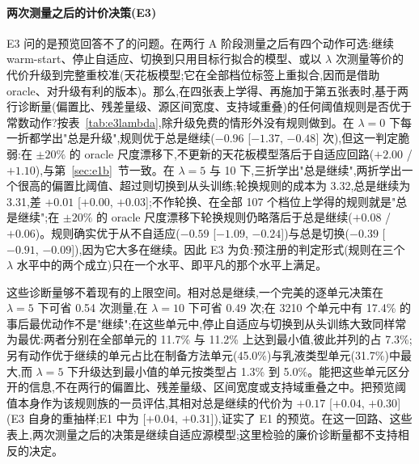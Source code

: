 \documentclass[11pt,a4paper]{ctexart}
\begin{document}
\paragraph{两次测量之后的计价决策(E3)} E3 问的是预览回答不了的问题。在两行 A 阶段测量之后有四个动作可选:继续 warm-start、停止自适应、切换到只用目标行拟合的模型、或以 $\lambda$ 次测量等价的代价升级到完整重校准(天花板模型;它在全部档位标签上重拟合,因而是借助 oracle、对升级有利的版本)。那么,在四张表上学得、再施加于第五张表时,基于两行诊断量(偏置比、残差量级、源区间宽度、支持域重叠)的任何阈值规则是否优于常数动作?按表~\ref{tab:e3lambda},除升级免费的情形外没有规则做到。在 $\lambda = 0$ 下每一折都学出"总是升级",规则优于总是继续($-0.96$ [$-1.37$, $-0.48$] 次),但这一判定脆弱:在 $\pm 20\%$ 的 oracle 尺度漂移下,不更新的天花板模型落后于自适应回路($+2.00$ / $+1.10$),与第~\ref{sec:e1b}~节一致。在 $\lambda = 5$ 与 10 下,三折学出"总是继续",两折学出一个很高的偏置比阈值、超过则切换到从头训练;轮换规则的成本为 3.32,总是继续为 3.31,差 $+0.01$ [$+0.00$, $+0.03$];不作轮换、在全部 107 个档位上学得的规则就是"总是继续";在 $\pm 20\%$ 的 oracle 尺度漂移下轮换规则仍略落后于总是继续($+0.08$ / $+0.06$)。规则确实优于从不自适应($-0.59$ [$-1.09$, $-0.24$])与总是切换($-0.39$ [$-0.91$, $-0.09$]),因为它大多在继续。因此 E3 为负:预注册的判定形式(规则在三个 $\lambda$ 水平中的两个成立)只在一个水平、即平凡的那个水平上满足。

这些诊断量够不着现有的上限空间。相对总是继续,一个完美的逐单元决策在 $\lambda = 5$ 下可省 0.54 次测量,在 $\lambda = 10$ 下可省 0.49 次;在 3210 个单元中有 17.4\% 的事后最优动作不是"继续";在这些单元中,停止自适应与切换到从头训练大致同样常为最优:两者分别在全部单元的 11.7\% 与 11.2\% 上达到最小值,彼此并列的占 7.3\%;另有动作优于继续的单元占比在制备方法单元(45.0\%)与乳液类型单元(31.7\%)中最大,而 $\lambda = 5$ 下升级达到最小值的单元按类型占 1.3\% 到 5.0\%。能把这些单元区分开的信息,不在两行的偏置比、残差量级、区间宽度或支持域重叠之中。把预览阈值本身作为该规则族的一员评估,其相对总是继续的代价为 $+0.17$ [$+0.04$, $+0.30$](E3 自身的重抽样;E1 中为 [$+0.04$, $+0.31$]),证实了 E1 的预览。在这一回路、这些表上,两次测量之后的决策是继续自适应源模型;这里检验的廉价诊断量都不支持相反的决定。
\end{document}

